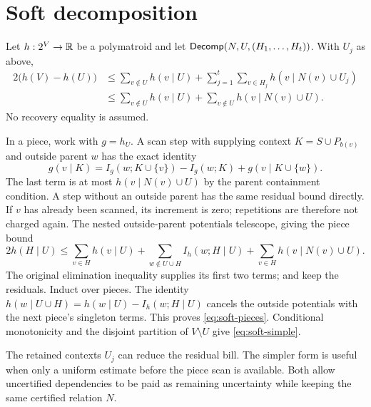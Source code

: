 \section{Soft decomposition}\label{sec:soft}

\begin{theorem}\label{thm:soft}
Let $h:2^V\to\mathbb{R}$ be a polymatroid and let
$\mathsf{Decomp}(N,U,(H_1,\ldots,H_t))$. With $U_j$ as above,
\begin{align}
2\bigl(h(V)-h(U)\bigr)
&\le \sum_{v\notin U}h(v\mid U)
   +\sum_{j=1}^t\sum_{v\in H_j}h(v\mid N(v)\cup U_j)
\label{eq:soft-pieces}\\
&\le \sum_{v\notin U}h(v\mid U)
   +\sum_{v\notin U}h(v\mid N(v)\cup U).
\label{eq:soft-simple}
\end{align}
No recovery equality is assumed.
\end{theorem}
\begin{outline}
In a piece, work with $g=h_U$. A scan step with supplying context
$K=S\cup P_{b(v)}$ and outside parent $w$ has the exact identity
\[
g(v\mid K)
=I_g(w;K\cup\{v\})-I_g(w;K)+g(v\mid K\cup\{w\}).
\]
The last term is at most $h(v\mid N(v)\cup U)$ by the parent
containment condition. A step without an outside parent has the same
residual bound directly. If $v$ has already been scanned, its increment
is zero; repetitions are therefore not charged again. The nested
outside-parent potentials telescope, giving the piece bound
\[
2h(H\mid U)\le
\sum_{v\in H}h(v\mid U)
+\sum_{w\notin U\cup H} I_h(w;H\mid U)
+\sum_{v\in H}h(v\mid N(v)\cup U).
\]
The original elimination inequality supplies its first two terms;
 and  keep the
residuals. Induct over pieces. The identity
$h(w\mid U\cup H)=h(w\mid U)-I_h(w;H\mid U)$ cancels the outside
potentials with the next piece's singleton terms. This proves
\eqref{eq:soft-pieces}. Conditional monotonicity and the disjoint
partition of $V\setminus U$ give \eqref{eq:soft-simple}.
\end{outline}

The retained contexts $U_j$ can reduce the residual bill. The simpler
form is useful when only a uniform estimate before the piece scan is
available. Both allow uncertified dependencies to be paid as remaining
uncertainty while keeping the same certified relation $N$.

